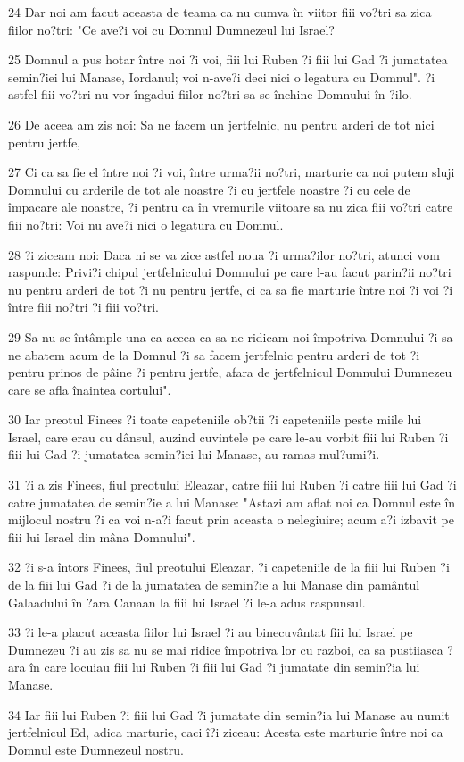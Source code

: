 \par 24 Dar noi am facut aceasta de teama ca nu cumva în viitor fiii vo?tri sa zica fiilor no?tri: "Ce ave?i voi cu Domnul Dumnezeul lui Israel?
\par 25 Domnul a pus hotar între noi ?i voi, fiii lui Ruben ?i fiii lui Gad ?i jumatatea semin?iei lui Manase, Iordanul; voi n-ave?i deci nici o legatura cu Domnul". ?i astfel fiii vo?tri nu vor îngadui fiilor no?tri sa se închine Domnului în ?ilo.
\par 26 De aceea am zis noi: Sa ne facem un jertfelnic, nu pentru arderi de tot nici pentru jertfe,
\par 27 Ci ca sa fie el între noi ?i voi, între urma?ii no?tri, marturie ca noi putem sluji Domnului cu arderile de tot ale noastre ?i cu jertfele noastre ?i cu cele de împacare ale noastre, ?i pentru ca în vremurile viitoare sa nu zica fiii vo?tri catre fiii no?tri: Voi nu ave?i nici o legatura cu Domnul.
\par 28 ?i ziceam noi: Daca ni se va zice astfel noua ?i urma?ilor no?tri, atunci vom raspunde: Privi?i chipul jertfelnicului Domnului pe care l-au facut parin?ii no?tri nu pentru arderi de tot ?i nu pentru jertfe, ci ca sa fie marturie între noi ?i voi ?i între fiii no?tri ?i fiii vo?tri.
\par 29 Sa nu se întâmple una ca aceea ca sa ne ridicam noi împotriva Domnului ?i sa ne abatem acum de la Domnul ?i sa facem jertfelnic pentru arderi de tot ?i pentru prinos de pâine ?i pentru jertfe, afara de jertfelnicul Domnului Dumnezeu care se afla înaintea cortului".
\par 30 Iar preotul Finees ?i toate capeteniile ob?tii ?i capeteniile peste miile lui Israel, care erau cu dânsul, auzind cuvintele pe care le-au vorbit fiii lui Ruben ?i fiii lui Gad ?i jumatatea semin?iei lui Manase, au ramas mul?umi?i.
\par 31 ?i a zis Finees, fiul preotului Eleazar, catre fiii lui Ruben ?i catre fiii lui Gad ?i catre jumatatea de semin?ie a lui Manase: "Astazi am aflat noi ca Domnul este în mijlocul nostru ?i ca voi n-a?i facut prin aceasta o nelegiuire; acum a?i izbavit pe fiii lui Israel din mâna Domnului".
\par 32 ?i s-a întors Finees, fiul preotului Eleazar, ?i capeteniile de la fiii lui Ruben ?i de la fiii lui Gad ?i de la jumatatea de semin?ie a lui Manase din pamântul Galaadului în ?ara Canaan la fiii lui Israel ?i le-a adus raspunsul.
\par 33 ?i le-a placut aceasta fiilor lui Israel ?i au binecuvântat fiii lui Israel pe Dumnezeu ?i au zis sa nu se mai ridice împotriva lor cu razboi, ca sa pustiiasca ?ara în care locuiau fiii lui Ruben ?i fiii lui Gad ?i jumatate din semin?ia lui Manase.
\par 34 Iar fiii lui Ruben ?i fiii lui Gad ?i jumatate din semin?ia lui Manase au numit jertfelnicul Ed, adica marturie, caci î?i ziceau: Acesta este marturie între noi ca Domnul este Dumnezeul nostru.

